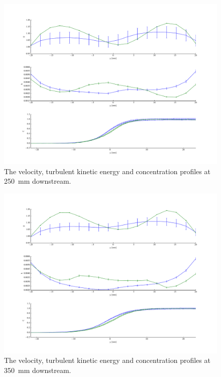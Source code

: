 \documentclass[11 pt]{article}
\begin{document}
\begin{appendices}
\begin{figure}[h]
		\end{figure}
		\begin{figure}[h]
			\centering
			\includegraphics[width=\textwidth]{three_250.pdf}
			\caption{The velocity, turbulent kinetic energy and concentration profiles at \SI{250}{mm} downstream. }
		\end{figure}
		\begin{figure}[h]
			\centering
			\includegraphics[width=\textwidth]{three_350.pdf}
			\caption{The velocity, turbulent kinetic energy and concentration profiles at \SI{350}{mm} downstream. }
		\end{figure}
		\begin{figure}[h]
			\centering

\end{figure}
\end{appendices}
\end{document}
